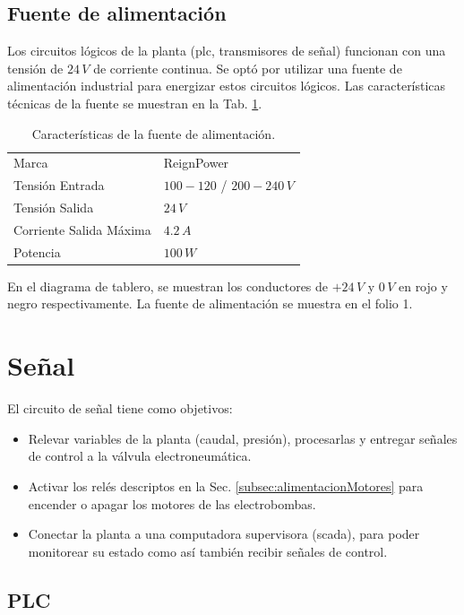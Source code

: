 \subsection{Fuente de alimentación}
\label{subsec:fuenteAlim}
Los circuitos lógicos de la planta (\gls{plc}, transmisores de señal) funcionan con una
tensión de $24\,V$ de corriente continua.
Se optó por utilizar una fuente de alimentación industrial para energizar estos
circuitos lógicos.
Las características técnicas de la fuente se muestran en la Tab.
\ref{tab:fuenteAlim}.
\begin{table}[h]
\renewcommand{\arraystretch}{1.3}
\centering
\begin{tabular}{|l|l|}
\hline
Marca & ReignPower\\
Tensión Entrada& $100-120$ / $200-240\,V$\\
Tensión Salida& $24\,V$\\
Corriente Salida Máxima& $4.2\,A$\\
Potencia & $100\,W$\\
\hline
\end{tabular}
\caption{Características de la fuente de alimentación.}
\label{tab:fuenteAlim}
\end{table}

En el diagrama de tablero, se muestran los conductores de $+24\,V$ y $0\,V$ en
rojo y negro respectivamente.
La fuente de alimentación se muestra en el folio 1.

\section{Señal}
\label{sec:Senal}

El circuito de señal tiene como objetivos:
\begin{itemize}
 \item Relevar variables de la planta (caudal, presión), procesarlas y entregar
señales de control a la válvula electroneumática.
\item Activar los relés descriptos en la Sec.
\ref{subsec:alimentacionMotores} para encender o apagar los motores de las
electrobombas.
\item Conectar la planta a una computadora supervisora (\gls{scada}), para poder
monitorear su estado como así también recibir señales de control.
\end{itemize}

\subsection{PLC}
\label{subsec:plc}

